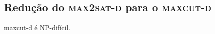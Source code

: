 		

	\bigskip
	\bigskip

	\subsection{Redução do \textbf{\textsc {max2sat-d}} para o \textbf{\textsc {maxcut-d}}}

		\begin{teo}
			{\sc maxcut-d} é NP-difícil.
		\end{teo}

